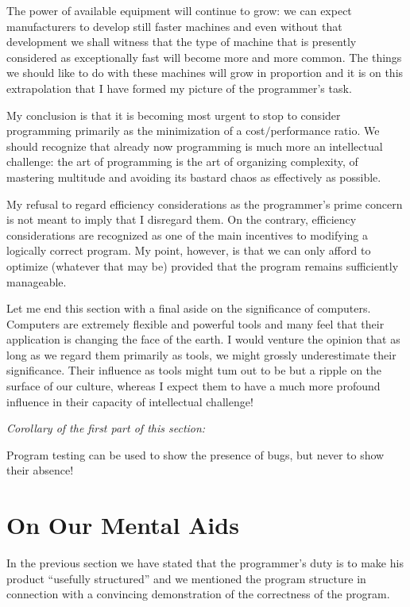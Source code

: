 \documentclass[twoside,11pt]{book}
\begin{document}
The power of available equipment will continue to grow: we can expect manufacturers to develop still faster machines and even without that development we shall witness that the type of machine that is presently considered as exceptionally fast will become more and more common. The things we should like to do with these machines will grow in proportion and it is on this extrapolation that I have formed my picture of the programmer's task.

My conclusion is that it is becoming most urgent to stop to consider programming primarily as the minimization of a cost$/$performance ratio. We
should recognize that already now programming is much more an intellectual challenge: the art of programming is the art of organizing complexity, of mastering multitude and avoiding its bastard chaos as effectively as possible.

My refusal to regard efficiency considerations as the programmer's prime concern is not meant to imply that I disregard them. On the contrary,
efficiency considerations are recognized as one of the main incentives to modifying a logically correct program. My point, however, is that we can
only afford to optimize (whatever that may be) provided that the program remains sufficiently manageable.

Let me end this section with a final aside on the significance of computers. Computers are extremely flexible and powerful tools and many feel that their application is changing the face of the earth. I would venture the opinion that as long as we regard them primarily as tools, we might grossly underestimate their significance. Their influence as tools might tum out to be but a ripple on the surface of our culture, whereas I expect them to have a much more profound influence in their capacity of intellectual challenge!
\smallskip

\noindent
\textit{Corollary of the first part of this section:}
\nopagebreak

Program testing can be used to show the presence of bugs, but never to show their absence!

\section[On our mental aids]{On Our Mental Aids}
\label{sec:out-mental-aids}

In the previous section we have stated that the programmer's duty is to make his product ``usefully structured'' and we mentioned the program structure in connection with a convincing demonstration of the correctness of the program.
\end{document}
